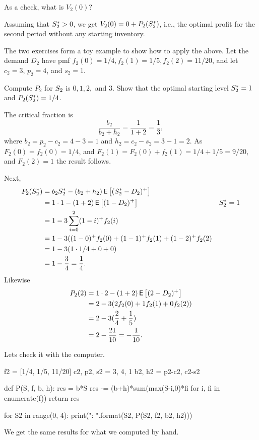 \begin{exercise}
As a check, what is $V_2(0)$? 
  \begin{solution}
    Assuming that $S_2^*>0$, we get $V_2(0) = 0 + P_2(S_2^*)$, i.e., the optimal profit for the second period without any starting inventory. 
  \end{solution}
\end{exercise}

The two exercises form a toy example to show how to apply the above. Let the demand $D_2$ have  pmf 
$f_2(0)=1/4, f_2(1)=1/5, f_2(2)=11/20$, and let $c_2=3$, $p_2=4$, and $s_2=1$. 

\begin{exercise}
Compute $P_2$ for $S_2$ is $0, 1, 2,$ and $3$. Show that the optimal starting level $S^*_2 = 1$ and $P_2(S_2^*) = 1/4$.
\begin{solution}
The critical fraction is 
\begin{equation*}
\frac{b_2}{b_2+h_2} = \frac{1}{1+2} = \frac 1 3,
\end{equation*}
where $b_2 =p_2-c_2 = 4-3=1$ and $h_2 =c_2 - s_2 = 3-1=2$. 
As $F_2(0)=f_2(0)=1/4$, and $F_2(1)=F_2(0) + f_2(1) = 1/4 + 1/5 = 9/20$, and $F_2(2)=1$ the result follows.

Next, 
\begin{align*}
  P_2(S_2^*) 
&= b_2 S_2^* - (b_2+h_2)\,\mathsf{E}\left[(S_2^*-D_2)^+\right] \\
&= 1\cdot 1 - (1+2)\,\mathsf{E}\left[(1-D_2)^+\right] & S_2^* = 1\\
&=1 - 3 \sum_{i=0}^2 (1-i)^+ f_2(i) \\
&=1 - 3 ((1-0)^+ f_2(0) + (1-1)^+ f_2(1) +(1-2)^+ f_2(2) \\
&=1 - 3 (1\cdot 1/4 + 0 + 0 ) \\
&=  1 - \frac 3 4 = \frac 1 4.
\end{align*}
Likewise 
\begin{align*}
  P_2(2) 
&= 1\cdot 2 - (1+2)\,\mathsf{E}\left[(2-D_2)^+\right] \\
&= 2 - 3 (2f_2(0) + 1 f_2(1) + 0 f_2(2))\\
&= 2 - 3 (\frac{2}{4} + \frac 1 5)\\
&= 2 - \frac{21}{10} = -\frac 1{10}.
\end{align*}

Lets check it with the computer.
\begin{pyconsole}
f2 = [1/4, 1/5, 11/20]
c2, p2, s2 = 3, 4, 1
b2, h2 = p2-c2, c2-s2

def P(S, f, b, h):
    res = b*S
    res -= (b+h)*sum(max(S-i,0)*fi for i, fi in enumerate(f))
    return res
    
for S2 in range(0, 4):
    print("{}: {}".format(S2, P(S2, f2, b2, h2)))

\end{pyconsole}
We get the same results for what we computed by hand.

\end{solution}
\end{exercise}

